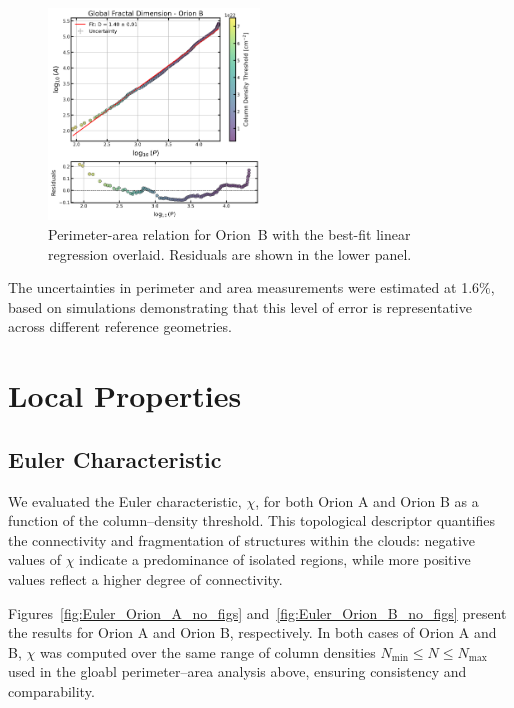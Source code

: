 \begin{figure}[t]
    \centering
    \includegraphics[width=0.5\textwidth]{figures/orion_B_global.png}
    \caption{Perimeter-area relation for Orion~B with the best-fit linear regression overlaid. Residuals are shown in the lower panel.}
    \label{fig:orion_B_global}
\end{figure}

The uncertainties in perimeter and area measurements were estimated at 1.6\%, based on simulations demonstrating that this level of error is representative across different reference geometries.

\section{Local Properties}

\subsection{Euler Characteristic}

We evaluated the Euler characteristic, \(\chi\), for both Orion A and Orion B as a function of the column–density threshold. This topological descriptor quantifies the connectivity and fragmentation of structures within the clouds: negative values of \(\chi\) indicate a predominance of isolated regions, while more positive values reflect a higher degree of connectivity.

Figures~\ref{fig:Euler_Orion_A_no_figs} and~\ref{fig:Euler_Orion_B_no_figs} present the results for Orion A and Orion B, respectively. In both cases of Orion A and B, \(\chi\) was computed over the same range of column densities \(N_\mathrm{min} \leq N \leq N_\mathrm{max}\) used in the gloabl perimeter–area analysis above, ensuring consistency and comparability.

